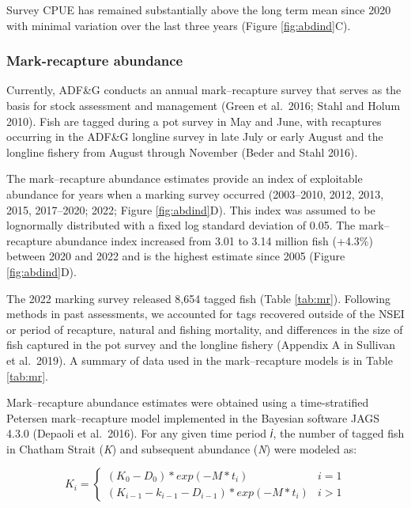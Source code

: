 \documentclass[
]{article}
\begin{document}
Survey CPUE has remained substantially above the long term mean since 2020 with minimal variation over the last three years (Figure \ref{fig:abdind}C).

\hypertarget{mark-recapture-abundance}{%
\subsubsection{Mark-recapture abundance}\label{mark-recapture-abundance}}

Currently, ADF\&G conducts an annual mark--recapture survey that serves as the basis for stock assessment and management (Green et al.~2016; Stahl and Holum 2010). Fish are tagged during a pot survey in May and June, with recaptures occurring in the ADF\&G longline survey in late July or early August and the longline fishery from August through November (Beder and Stahl 2016).

The mark--recapture abundance estimates provide an index of exploitable abundance for years when a marking survey occurred (2003--2010, 2012, 2013, 2015, 2017--2020; 2022; Figure \ref{fig:abdind}D). This index was assumed to be lognormally distributed with a fixed log standard deviation of 0.05. The mark--recapture abundance index increased from 3.01 to 3.14 million fish (+4.3\%) between 2020 and 2022 and is the highest estimate since 2005 (Figure \ref{fig:abdind}D).

The 2022 marking survey released 8,654 tagged fish (Table \ref{tab:mr}). Following methods in past assessments, we accounted for tags recovered outside of the NSEI or period of recapture, natural and fishing mortality, and differences in the size of fish captured in the pot survey and the longline fishery (Appendix A in Sullivan et al.~2019). A summary of data used in the mark--recapture models is in Table \ref{tab:mr}.

Mark--recapture abundance estimates were obtained using a time-stratified Petersen mark--recapture model implemented in the Bayesian software JAGS 4.3.0 (Depaoli et al.~2016). For any given time period 𝑖, the number of tagged fish in Chatham Strait (\emph{K}) and subsequent abundance (\emph{N}) were modeled as:

\[
\begin{equation}
K_{i} = \left\{ \begin{array}{ll}
(K_0 - D_0)*exp(-M*t_i) &i = 1\\
(K_{i-1} - k_{i-1} - D_{i-1})*exp(-M*t_i) & i > 1
\end{array}\right.
\label{eq:mr1}
\end{equation}
\]
\end{document}
